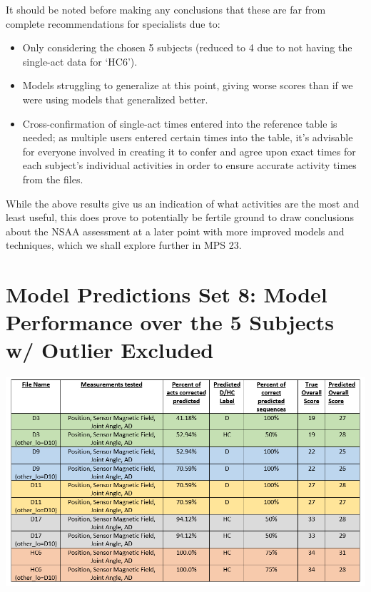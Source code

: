 \documentclass[12pt,twoside]{report}
\begin{document}
\quad It should be noted before making any conclusions that these are far from complete recommendations for specialists due to:

\begin{itemize}
	\item Only considering the chosen 5 subjects (reduced to 4 due to not having the single-act data for ‘HC6’).
	\item Models struggling to generalize at this point, giving worse scores than if we were using models that generalized better.
	\item Cross-confirmation of single-act times entered into the reference table is needed; as multiple users entered certain times into the table, it’s advisable for everyone involved in creating it to confer and agree upon exact times for each subject’s individual activities in order to ensure accurate activity times from the files.
\end{itemize}

\quad While the above results give us an indication of what activities are the most and least useful, this does prove to potentially be fertile ground to draw conclusions about the NSAA assessment at a later point with more improved models and techniques, which we shall explore further in MPS 23.






\section{Model Predictions Set 8: Model Performance over the 5 Subjects w/ Outlier Excluded}

\begin{center}
\includegraphics[scale=0.6]{project_figures/fig11_15}
\end{center}
\end{document}
